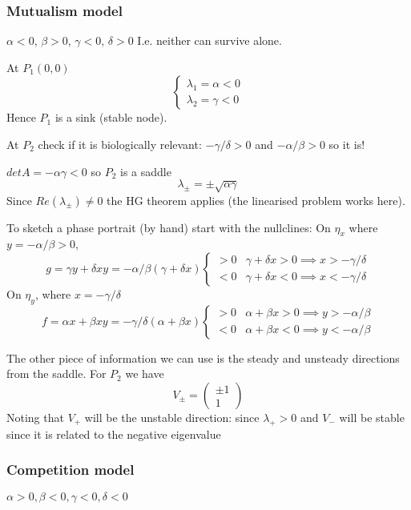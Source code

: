 \documentclass{/home/janmebows/Documents/LatexTemplates/myassignment}
\begin{document}
\subsubsection{Mutualism model}
$\alpha <0$, $\beta>0$, $\gamma <0$, $\delta>0$
I.e. neither can survive alone.

At $P_1(0,0) $
\[\begin{cases}
    \lambda_1 = \alpha < 0\\
    \lambda_2 = \gamma <0
\end{cases}\]
Hence $P_1$ is a sink (stable node).


At $P_2$ check if it is biologically relevant: $-\gamma/\delta >0$ and $-\alpha/\beta > 0$ so it is!

$detA = -\alpha \gamma <0$ so $P_2$ is a saddle
\[\lambda_\pm = \pm \sqrt{\alpha \gamma}\]
Since $Re(\lambda_\pm) \neq 0$ the HG theorem applies (the linearised problem works here).


To sketch a phase portrait (by hand) start with the nullclines:
On $\eta_x$ where $y = -\alpha/\beta > 0$, 
\[g = \gamma y + \delta xy = -\alpha/\beta(\gamma + \delta x) \begin{cases}
    > 0 & \gamma+\delta x > 0 \implies x > -\gamma/\delta\\
    < 0 & \gamma+\delta x < 0 \implies x < - \gamma/\delta
\end{cases}\]
On $\eta_y$, where $x = -\gamma/\delta$
\[f = \alpha x + \beta xy = -\gamma/\delta(\alpha + \beta x) \begin{cases}
    > 0 & \alpha+\beta x > 0 \implies y > -\alpha/\beta\\
    < 0 & \alpha+\beta x < 0 \implies y < - \alpha/\beta
\end{cases}\]

The other piece of information we can use is the steady and unsteady directions from the saddle.
For $P_2$ we have
\[V_\pm = \begin{pmatrix}
    \pm 1\\1
\end{pmatrix}\]
Noting that $V_+$ will be the unstable direction: since $\lambda_+ > 0$ and $V_-$ will be stable since it is related to the negative eigenvalue



\subsubsection{Competition model}
$\alpha>0, \beta<0, \gamma<0, \delta<0$
\end{document}
